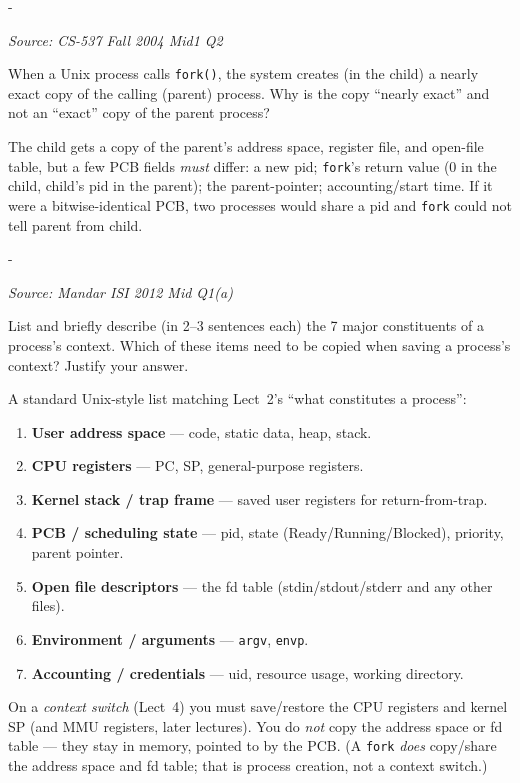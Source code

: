 \documentclass[11pt,a4paper]{article}
\makeatletter
\newcommand{\keepspace}[1]{\par\penalty-100\begingroup
  \setlength{\dimen@}{#1}\dimen@ii\pagegoal\advance\dimen@ii-\pagetotal
  \ifdim\dimen@>\dimen@ii\ifdim\dimen@ii>\z@\vfil\fi\break\fi\endgroup}
\newcounter{qn}[section]
\newenvironment{Qn}[4]{%
  \refstepcounter{qn}\keepspace{7\baselineskip}%
  \begin{tcolorbox}[qboxstyle, title={Q\thesection.\theqn\ \ [#1 \textbar\ #2]\ \ #4}]%
  {\footnotesize\color{g3}\textit{Source: #3}}\par\smallskip%
}{%
  \end{tcolorbox}%
}
\newenvironment{Sol}{%
  \begin{tcolorbox}[sboxstyle, title={Solution}]%
}{%
  \end{tcolorbox}\vspace{0.35em}%
}
\makeatother
\begin{document}
\begin{Qn}{Medium}{Lect 3}{CS-537 Fall 2004 Mid1 Q2}{Why is a \texttt{fork}ed child a \emph{nearly} exact copy?}
When a Unix process calls \texttt{fork()}, the system creates (in the child) a nearly exact copy of the calling (parent) process. Why is the copy ``nearly exact'' and not an ``exact'' copy of the parent process?
\end{Qn}
\begin{Sol}
The child gets a copy of the parent's address space, register file, and open-file table, but a few PCB fields \emph{must} differ: a new pid; \texttt{fork}'s return value (0 in the child, child's pid in the parent); the parent-pointer; accounting/start time. If it were a bitwise-identical PCB, two processes would share a pid and \texttt{fork} could not tell parent from child.
\end{Sol}

\begin{Qn}{Medium}{Lect 2}{Mandar ISI 2012 Mid Q1(a)}{Seven constituents of a process's context}
List and briefly describe (in 2--3 sentences each) the 7 major constituents of a process's context. Which of these items need to be copied when saving a process's context? Justify your answer.
\end{Qn}
\begin{Sol}
A standard Unix-style list matching Lect~2's ``what constitutes a process'':
\begin{enumerate}
  \item \textbf{User address space} --- code, static data, heap, stack.
  \item \textbf{CPU registers} --- PC, SP, general-purpose registers.
  \item \textbf{Kernel stack / trap frame} --- saved user registers for return-from-trap.
  \item \textbf{PCB / scheduling state} --- pid, state (Ready/Running/Blocked), priority, parent pointer.
  \item \textbf{Open file descriptors} --- the fd table (stdin/stdout/stderr and any other files).
  \item \textbf{Environment / arguments} --- \texttt{argv}, \texttt{envp}.
  \item \textbf{Accounting / credentials} --- uid, resource usage, working directory.
\end{enumerate}
On a \emph{context switch} (Lect~4) you must save/restore the CPU registers and kernel SP (and MMU registers, later lectures). You do \emph{not} copy the address space or fd table --- they stay in memory, pointed to by the PCB. (A \texttt{fork} \emph{does} copy/share the address space and fd table; that is process creation, not a context switch.)
\end{Sol}
\end{document}
